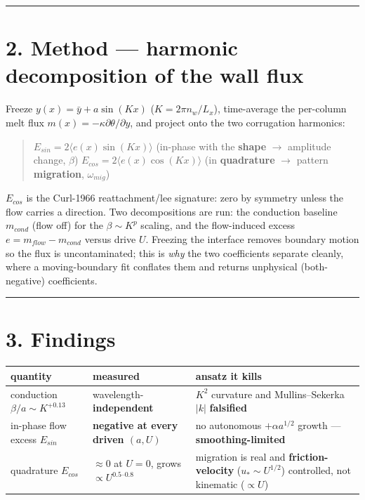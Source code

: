 \documentclass[11pt]{article}
\begin{document}
\medskip\hrule\medskip


\section*{2. Method — harmonic decomposition of the wall flux}


Freeze $y(x)=\bar{y}+a \sin(Kx)$ ($K=2\pi n_{w}/L_{x}$), time-average the per-column melt flux $m(x)=-\kappa  \partial \theta /\partial y$, and project onto the two corrugation harmonics:


\begin{quote}
$E_{sin} = 2\langle e(x) \sin(Kx)\rangle $ (in-phase with the \textbf{shape} \ensuremath{\to} amplitude change, $\beta $) $E_{cos} = 2\langle e(x) \cos(Kx)\rangle $ (in \textbf{quadrature} \ensuremath{\to} pattern \textbf{migration}, $\omega _{mig}$)
\end{quote}


$E_{cos}$ is the Curl-1966 reattachment/lee signature: zero by symmetry unless the flow carries a direction. Two decompositions are run: the conduction baseline $m_{cond}$ (flow off) for the $\beta  \sim  K^{p}$ scaling, and the flow-induced excess $e = m_{flow} - m_{cond}$ versus drive $U$. Freezing the interface removes boundary motion so the flux is uncontaminated; this is \emph{why} the two coefficients separate cleanly, where a moving-boundary fit conflates them and returns unphysical (both-negative) coefficients.


\medskip\hrule\medskip


\section*{3. Findings}


\begin{center}\small
\begin{tabularx}{\linewidth}{>{\raggedright\arraybackslash}X>{\raggedright\arraybackslash}X>{\raggedright\arraybackslash}X}
\toprule
quantity & measured & ansatz it kills \\
\midrule
conduction $\beta /a \sim  K^{+0.13}$ & wavelength-\textbf{independent} & $K^{2}$ curvature and Mullins–Sekerka $|k|$ \textbf{falsified} \\
in-phase flow excess $E_{sin}$ & \textbf{negative at every driven $(a,U)$} & no autonomous $+\alpha  a^{1/2}$ growth — \textbf{smoothing-limited} \\
quadrature $E_{cos}$ & $\approx 0$ at $U=0$, grows $\propto  U^{0.5–0.8}$ & migration is real and \textbf{friction-velocity} ($u_*\sim U^{1/2}$) controlled, not kinematic ($\propto U$) \\
\bottomrule
\end{tabularx}
\end{center}
\end{document}
